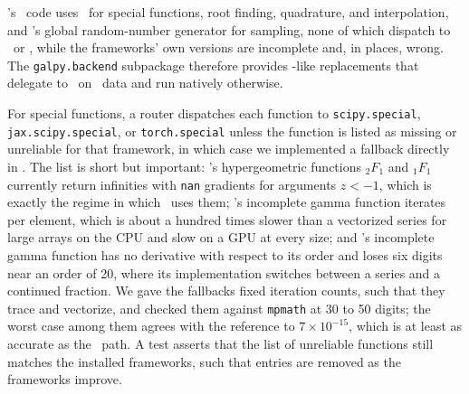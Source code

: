 \galpy's \numpy\ code uses \scipy\ for special functions, root finding,
quadrature, and interpolation, and \numpy's global random-number
generator for sampling, none of which dispatch to \jax\ or \torch, while
the frameworks' own versions are incomplete and, in places, wrong. The
\texttt{galpy.backend} subpackage therefore provides \scipy-like
replacements that delegate to \scipy\ on \numpy\ data and run natively
otherwise.

For special functions, a router dispatches each function to
\texttt{scipy.special}, \texttt{jax.scipy.special}, or
\texttt{torch.special} unless the function is listed as missing or
unreliable for that framework, in which case we implemented a fallback directly in
\galpy. The list is short but important: \jax's hypergeometric
functions ${}_2F_1$ and ${}_1F_1$ currently return infinities with \texttt{nan}
gradients for arguments $z<-1$, which is exactly the regime in which
\galpy\ uses them; \jax's incomplete gamma function iterates per element,
which is about a hundred times slower than a vectorized series for large
arrays on the CPU and slow on a GPU at every size; and
\torch's incomplete gamma function has no derivative with respect to its
order and loses six digits near an order of 20, where its implementation
switches between a series and a continued fraction. We gave the
fallbacks fixed iteration counts, such that they trace and vectorize,
and checked them against \texttt{mpmath} at 30 to 50 digits; the worst
case
among them agrees with the reference to $7\times10^{-15}$, which is at
least as accurate as the \scipy\ path. A test asserts that the list of
unreliable functions still matches the installed frameworks, such that
entries are removed as the frameworks improve.

